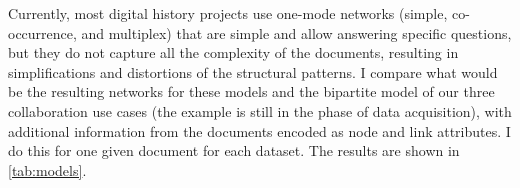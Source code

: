

Currently, most digital history projects use one-mode networks (simple, co-occurrence, and multiplex) that are simple and allow answering specific questions, but they do not capture all the complexity of the documents, resulting in simplifications and distortions of the structural patterns.
I compare what would be the resulting networks for these models and the bipartite model of our three collaboration use cases (the example \dana is still in the phase of data acquisition), with additional information from the documents encoded as node and link attributes.
I do this for one given document for each dataset.
The results are shown in \autoref{tab:models}.

